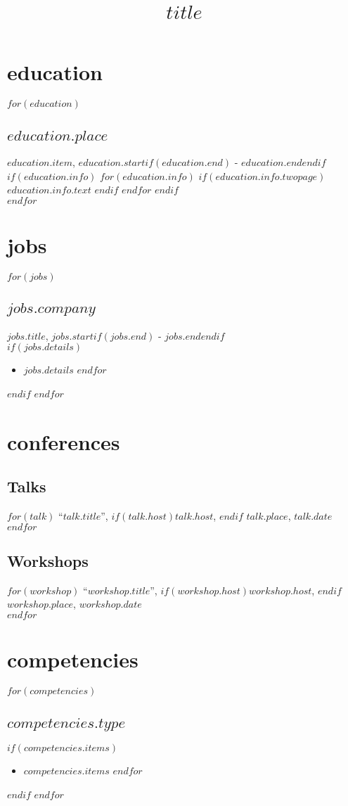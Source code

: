 \documentclass[11pt, A4]{article}
\title{$title$}
\begin{document}
\maketitle

\section{education}
$for(education)$
\subsection{$education.place$}
$education.item$, $education.start$$if(education.end)$ - $education.end$$endif$
$if(education.info)$ $for(education.info)$ $if(education.info.twopage)$ $education.info.text$ $endif$ $endfor$ $endif$ \\[.25cm]
$endfor$

\section{jobs}
$for(jobs)$
\subsection{$jobs.company$}
$jobs.title$,
$jobs.start$$if(jobs.end)$ - $jobs.end$$endif$\\[.25cm]
$if(jobs.details)$
\begin{itemize}
$for(jobs.details)$
\item $jobs.details$
$endfor$
\end{itemize}
$endif$
$endfor$

\section{conferences}

\subsection{Talks}
$for(talk)$
``$talk.title$'', $if(talk.host)$$talk.host$, $endif$
$talk.place$, $talk.date$\\[.25cm]
$endfor$

\subsection{Workshops}
$for(workshop)$
``$workshop.title$'', $if(workshop.host)$$workshop.host$, $endif$
$workshop.place$, $workshop.date$\\[.25cm]
$endfor$

\section{competencies}
$for(competencies)$
\subsection{$competencies.type$}
$if(competencies.items)$
\begin{itemize}
$for(competencies.items)$
\item $competencies.items$
$endfor$
\end{itemize}
$endif$
$endfor$
\end{document}
